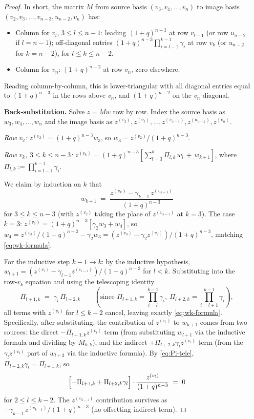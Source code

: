 \documentclass[11pt]{article}
\theoremstyle{definition}
\begin{document}
\begin{proof}
In short, the matrix $M$ from source basis $(v_3, v_4, \ldots, v_n)$
to image basis $(v_2, v_3, \ldots, v_{n-3}, u_{n-2}, v_n)$ has:
\begin{itemize}[topsep=0.3em,itemsep=0.2em,leftmargin=2em]
\item Column for $v_l$, $3 \le l \le n-1$: leading $(1+q)^{n-3}$ at
  row $v_{l-1}$ (or row $u_{n-2}$ if $l = n-1$); off-diagonal entries
  $(1+q)^{n-3} \prod_{i=l-1}^{k-1}\gamma_i$ at row $v_k$ (or $u_{n-2}$
  for $k = n-2$), for $l \le k \le n-2$.
\item Column for $v_n$: $(1+q)^{n-2}$ at row $v_n$, zero elsewhere.
\end{itemize}
Reading column-by-column, this is lower-triangular with all diagonal
entries equal to $(1+q)^{n-3}$ in the rows above $v_n$, and
$(1+q)^{n-2}$ on the $v_n$-diagonal.

\medskip
\textbf{Back-substitution.}  Solve $z = M w$ row by row.  Index the
source basis as $w_3, w_4, \ldots, w_n$ and the image basis as
$z^{(v_2)}, z^{(v_3)}, \ldots, z^{(v_{n-3})}, z^{(u_{n-2})}, z^{(v_n)}$.

\emph{Row $v_2$:} $z^{(v_2)} = (1+q)^{n-3} w_3$, so
$w_3 = z^{(v_2)}/(1+q)^{n-3}$.

\emph{Row $v_k$, $3 \le k \le n-3$:}
$z^{(v_k)} = (1+q)^{n-3}\!\left[\sum_{l=3}^{k}\Pi_{l,k}\, w_l \,+\, w_{k+1}\right]$,
where $\Pi_{l,k} := \prod_{i=l-1}^{k-1}\gamma_i$.

We claim by induction on $k$ that
\begin{equation}\label{eq:wk-formula}
   w_{k+1} \;=\; \frac{z^{(v_k)} - \gamma_{k-1}\, z^{(v_{k-1})}}{(1+q)^{n-3}}
\end{equation}
for $3 \le k \le n-3$ (with $z^{(v_2)}$ taking the place of
$z^{(v_{k-1})}$ at $k = 3$).  The case $k = 3$:
$z^{(v_3)} = (1+q)^{n-3}[\gamma_2 w_3 + w_4]$, so
$w_4 = z^{(v_3)}/(1+q)^{n-3} - \gamma_2 w_3
     = (z^{(v_3)} - \gamma_2 z^{(v_2)})/(1+q)^{n-3}$, matching
\eqref{eq:wk-formula}.

For the inductive step $k-1 \to k$: by the inductive hypothesis,
$w_{l+1} = (z^{(v_l)} - \gamma_{l-1} z^{(v_{l-1})})/(1+q)^{n-3}$ for
$l < k$.  Substituting into the row-$v_k$ equation and using the
telescoping identity
\begin{equation}\label{eq:Pi-tele}
   \Pi_{l+1,k} \;=\; \gamma_l\,\Pi_{l+2,k}
   \qquad (\text{since } \Pi_{l+1,k} = \prod_{i=l}^{k-1}\gamma_i,\
          \Pi_{l+2,k} = \prod_{i=l+1}^{k-1}\gamma_i),
\end{equation}
all terms with $z^{(v_l)}$ for $l \le k-2$ cancel, leaving exactly
\eqref{eq:wk-formula}.  Specifically, after substituting, the
contribution of $z^{(v_l)}$ to $w_{k+1}$ comes from two sources:
the direct $-\Pi_{l+1,k} z^{(v_l)}$ term (from substituting
$w_{l+1}$ via the inductive formula and dividing by $M_{k,k}$),
and the indirect $+\Pi_{l+2,k} \gamma_{l} z^{(v_l)}$ term (from the
$\gamma_{l} z^{(v_l)}$ part of $w_{l+2}$ via the inductive formula).
By \eqref{eq:Pi-tele}, $\Pi_{l+2,k}\gamma_l = \Pi_{l+1,k}$, so
\[
\Bigl[-\Pi_{l+1,k} + \Pi_{l+2,k}\gamma_l\Bigr]\cdot\frac{z^{(v_l)}}{(1+q)^{n-3}}
\;=\; 0
\]
for $2 \le l \le k-2$.  The $z^{(v_{k-1})}$ contribution survives as
$-\gamma_{k-1}\, z^{(v_{k-1})}/(1+q)^{n-3}$ (no offsetting indirect term).


\end{proof}
\end{document}
